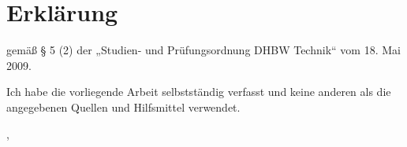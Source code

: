 \thispagestyle{empty}

\section*{Erklärung}
\vspace*{2em}

gemäß § 5 (2) der „Studien- und Prüfungsordnung DHBW Technik“ vom 18. Mai 2009.

Ich habe die vorliegende Arbeit selbstständig verfasst und keine anderen als die angegebenen
Quellen und Hilfsmittel verwendet.
\vspace{3em}

\abgabeort, \datumAbgabe
\vspace{4em}

\autor

